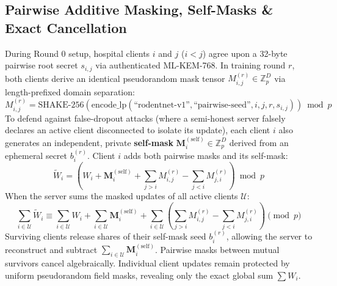 \documentclass[11pt,a4paper]{report}
\begin{document}
\subsection{Pairwise Additive Masking, Self-Masks \& Exact Cancellation}
During Round 0 setup, hospital clients $i$ and $j$ ($i < j$) agree upon a 32-byte pairwise root secret $s_{i,j}$ via authenticated ML-KEM-768. In training round $r$, both clients derive an identical pseudorandom mask tensor $M_{i,j}^{(r)} \in \mathbb{Z}_p^D$ via length-prefixed domain separation:
\begin{equation}
M_{i,j}^{(r)} = \text{SHAKE-256}(\text{encode\_lp}(\text{``rodentnet-v1''}, \text{``pairwise-seed''}, i, j, r, s_{i,j})) \bmod p
\end{equation}
To defend against false-dropout attacks (where a semi-honest server falsely declares an active client disconnected to isolate its update), each client $i$ also generates an independent, private \textbf{self-mask} $\mathbf{M}_i^{(\text{self})} \in \mathbb{Z}_p^D$ derived from an ephemeral secret $b_i^{(r)}$. Client $i$ adds both pairwise masks and its self-mask:
\begin{equation}
\widetilde{W}_i = \left( W_i + \mathbf{M}_i^{(\text{self})} + \sum_{j > i} M_{i,j}^{(r)} - \sum_{j < i} M_{j,i}^{(r)} \right) \bmod p
\end{equation}
When the server sums the masked updates of all active clients $\mathcal{U}$:
\begin{equation}
\sum_{i \in \mathcal{U}} \widetilde{W}_i \equiv \sum_{i \in \mathcal{U}} W_i + \sum_{i \in \mathcal{U}} \mathbf{M}_i^{(\text{self})} + \sum_{i \in \mathcal{U}} \left( \sum_{j > i} M_{i,j}^{(r)} - \sum_{j < i} M_{j,i}^{(r)} \right) \pmod p
\end{equation}
Surviving clients release shares of their self-mask seed $b_i^{(r)}$, allowing the server to reconstruct and subtract $\sum_{i \in \mathcal{U}} \mathbf{M}_i^{(\text{self})}$. Pairwise masks between mutual survivors cancel algebraically. Individual client updates remain protected by uniform pseudorandom field masks, revealing only the exact global sum $\sum W_i$.
\end{document}
